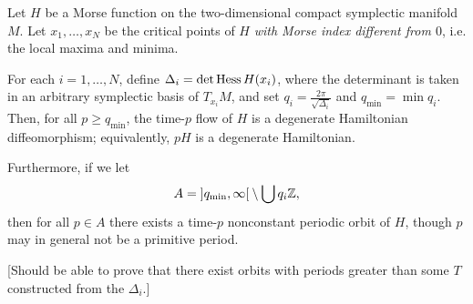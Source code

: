 \begin{corollary}
Let $H$ be a Morse function on the two-dimensional compact symplectic manifold $M$. Let $x_1, \dots, x_N$ be the critical points of $H$ \emph{with Morse index different from $0$}, i.e. the local maxima and minima.

For each $i = 1, \dots, N$, define $\Delta_i = \det \operatorname{Hess} H(x_i)$, where the determinant is taken in an arbitrary symplectic basis of $T_{x_i} M$, and set $q_i = \frac{2\pi}{\sqrt{\Delta_i}}$ and $q_{\min} = \min q_i$. Then, for all $p \geq q_{\min}$, the time-$p$ flow of $H$ is a degenerate Hamiltonian diffeomorphism; equivalently, $p H$ is a degenerate Hamiltonian.

Furthermore, if we let
\begin{equation}
A = \ointerval{q_{\min}}{\infty} \setminus \bigcup q_i \Z,
\end{equation}
then for all $p \in A$ there exists a time-$p$ nonconstant periodic orbit of $H$, though $p$ may in general not be a primitive period.

[Should be able to prove that there exist orbits with periods greater than some $T$ constructed from the $\Delta_i$.]
\end{corollary}

